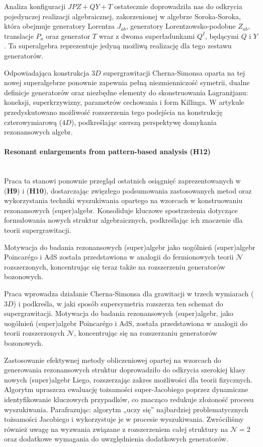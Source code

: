 \documentclass[12pt,a4paper]{article}
\newcommand{\myparagraph}[1]{\paragraph{#1}\mbox{}\\}
\begin{document}
Analiza konfiguracji $JPZ+QY+T$ ostatecznie doprowadziła nas do odkrycia pojedynczej realizacji algebraicznej, zakorzenionej w algebrze Soroka-Soroka, która obejmuje generatory Lorentza $J_{ab}$, generatory Lorentzowsko-podobne $Z_{ab}$, translacje $P_a$ oraz generator $T$ wraz z dwoma superładunkami $Q^I$, będącymi $Q$ i $Y$. Ta superalgebra reprezentuje jedyną możliwą realizację dla tego zestawu generatorów.

Odpowiadająca konstrukcja $3D$ supergrawitacji Cherna-Simonsa oparta na tej nowej superalgebrze ponownie zapewnia pełną niezmienniczość symetrii, dualne definicje generatorów oraz niezbędne elementy do skonstruowania Lagranżjanu: koneksji, superkrzywizny, parametrów cechowania i form Killinga. W artykule przedyskutowano możliwość rozszerzenia tego podejścia na konstrukcję czterowymiarową ($4D$), podkreślając szerszą perspektywę domykania rezonansowych algebr.

\myparagraph{Resonant enlargements from pattern-based analysis (H12)} 

Praca ta stanowi ponownie przegląd ostatnich osiągnięć zaprezentowanych w (\textbf{H9}) i (\textbf{H10}), dostarczając zwięzłego podsumowania zastosowanych metod oraz wykorzystania techniki wyszukiwania opartego na wzorcach w konstruowaniu rezonansowych (super)algebr. Konsoliduje kluczowe spostrzeżenia dotyczące formułowania nowych struktur algebraicznych, podkreślając ich znaczenie dla teorii supergrawitacji. 

Motywacja do badania rezonansowych (super)algebr jako uogólnień (super)algebr Poincarégo i AdS została przedstawiona w analogii do fermionowych teorii $\mathcal{N}$ rozszerzonych, koncentrując się teraz także na rozszerzeniu generatorów bozonowych.

Praca wprowadza działanie Cherna-Simonsa dla grawitacji w trzech wymiarach ($3D$) i podkreśla, w jaki sposób supersymetria rozszerza ten schemat do supergrawitacji. Motywacja do badania rezonansowych (super)algebr, jako uogólnień (super)algebr Poincarégo i AdS, została przedstawiona w analogii do teorii rozszerzonych $\mathcal{N}$, koncentrując się na rozszerzaniu generatorów bozonowych.

Zastosowanie efektywnej metody obliczeniowej opartej na wzorcach do generowania rezonansowych struktur doprowadziło do odkrycia szerokiej klasy nowych (super)algebr Liego, rozszerzając zakres możliwości dla teorii fizycznych. Algorytm upraszcza ewaluację tożsamości super-Jacobiego poprzez dynamiczne identyfikowanie kluczowych przypadków, co znacząco redukuje złożoność procesu wyszukiwania. Parafrazując:  algorytm „uczy się” najbardziej problematycznych tożsamości Jacobiego i wykorzystuje je w procesie wyszukiwania. Zwróciliśmy również uwagę na wyzwania związane z rozszerzeniem całej struktury na $\mathcal{N}=2$ oraz dodatkowe wymagania do uwzględnienia dodatkowych generatorów.
\end{document}
